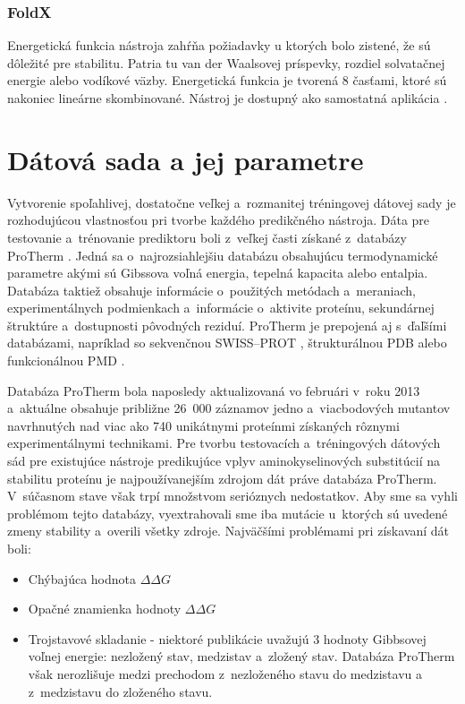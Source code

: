 \subsection{FoldX}

Energetická funkcia nástroja zahŕňa požiadavky u ktorých bolo zistené, že sú dôležité pre stabilitu. Patria tu van der Waalsovej príspevky, rozdiel solvatačnej energie alebo vodíkové väzby. Energetická funkcia je tvorená 8 časťami, ktoré sú nakoniec lineárne skombinované. Nástroj je dostupný ako samostatná aplikácia \cite{foldx}.


\chapter{Dátová sada a jej parametre}

Vytvorenie spoľahlivej, dostatočne veľkej a~rozmanitej tréningovej dátovej sady je rozhodujúcou vlastnosťou pri tvorbe každého predikčného nástroja. Dáta pre testovanie a~trénovanie prediktoru boli z~veľkej časti získané z~databázy ProTherm \cite{protherm}. Jedná sa o~najrozsiahlejšiu databázu obsahujúcu termodynamické parametre akými sú Gibssova voľná energia, tepelná kapacita alebo entalpia. Databáza taktiež obsahuje informácie o~použitých metódach a~meraniach, experimentálnych podmienkach a~informácie o~aktivite proteínu, sekundárnej štruktúre a~dostupnosti pôvodných reziduí. ProTherm je prepojená aj s~ďaľšími databázami, napríklad so sekvenčnou SWISS--PROT \cite{swissprot}, štrukturálnou PDB \cite{pdb} alebo funkcionálnou PMD \cite{pmd}.


Databáza ProTherm bola naposledy aktualizovaná vo februári v~roku 2013 a~aktuálne obsahuje približne 26 000 záznamov jedno a~viacbodových mutantov navrhnutých nad viac ako 740 unikátnymi proteínmi získaných rôznymi experimentálnymi technikami. Pre tvorbu testovacích a~tréningových dátových sád pre existujúce nástroje predikujúce vplyv aminokyselinových substitúcií na stabilitu proteínu je najpoužívanejším zdrojom dát práve databáza ProTherm. V~súčasnom stave však trpí množstvom serióznych nedostatkov. Aby sme sa vyhli problémom tejto databázy, vyextrahovali sme iba mutácie u~ktorých sú uvedené zmeny stability a~overili všetky zdroje. Najväčšími problémami pri získavaní dát boli:
\begin{itemize}
	\item Chýbajúca hodnota $\Delta\Delta G$
	\item Opačné znamienka hodnoty $\Delta\Delta G$ 
	\item Trojstavové skladanie - niektoré publikácie uvažujú 3 hodnoty Gibbsovej voľnej energie: nezložený stav, medzistav a~zložený stav. Databáza ProTherm však nerozlišuje medzi prechodom z~nezloženého stavu do medzistavu a z~medzistavu do zloženého stavu.
\end{itemize}

